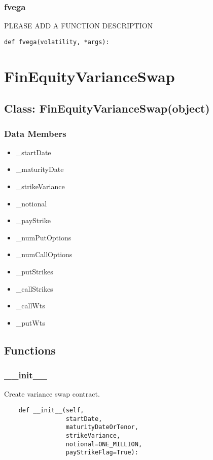 \documentclass[twoside,11pt]{book}
\begin{document}
\subsubsection*{{\bf fvega}}
PLEASE ADD A FUNCTION DESCRIPTION

\begin{lstlisting}
def fvega(volatility, *args):
\end{lstlisting}

\newpage
\section{FinEquityVarianceSwap}

\subsection*{Class: FinEquityVarianceSwap(object)}


\subsubsection*{Data Members}
\begin{itemize}
\item{\_startDate}
\item{\_maturityDate}
\item{\_strikeVariance}
\item{\_notional}
\item{\_payStrike}
\item{\_numPutOptions}
\item{\_numCallOptions}
\item{\_putStrikes}
\item{\_callStrikes}
\item{\_callWts}
\item{\_putWts}
\end{itemize}

\subsection*{Functions}

\subsubsection*{{\bf \_\_init\_\_}}
Create variance swap contract.  

\begin{lstlisting}
    def __init__(self,
                 startDate,
                 maturityDateOrTenor,
                 strikeVariance,
                 notional=ONE_MILLION,
                 payStrikeFlag=True):
\end{lstlisting}
\end{document}

